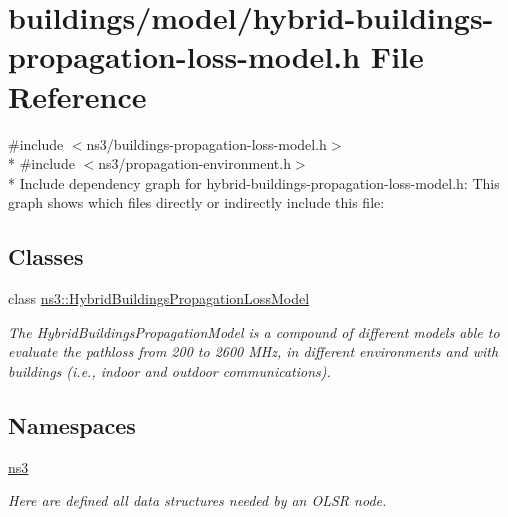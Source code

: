 \hypertarget{hybrid-buildings-propagation-loss-model_8h}{}\section{buildings/model/hybrid-\/buildings-\/propagation-\/loss-\/model.h File Reference}
\label{hybrid-buildings-propagation-loss-model_8h}
{\ttfamily \#include $<$ns3/buildings-\/propagation-\/loss-\/model.\+h$>$}\\*
{\ttfamily \#include $<$ns3/propagation-\/environment.\+h$>$}\\*
Include dependency graph for hybrid-\/buildings-\/propagation-\/loss-\/model.h\+:
This graph shows which files directly or indirectly include this file\+:
\subsection*{Classes}
\begin{DoxyCompactItemize}
\item 
class \hyperlink{classns3_1_1HybridBuildingsPropagationLossModel}{ns3\+::\+Hybrid\+Buildings\+Propagation\+Loss\+Model}
\begin{DoxyCompactList}\small\item\em The Hybrid\+Buildings\+Propagation\+Model is a compound of different models able to evaluate the pathloss from 200 to 2600 M\+Hz, in different environments and with buildings (i.\+e., indoor and outdoor communications). \end{DoxyCompactList}\end{DoxyCompactItemize}
\subsection*{Namespaces}
\begin{DoxyCompactItemize}
\item 
 \hyperlink{namespacens3}{ns3}
\begin{DoxyCompactList}\small\item\em Here are defined all data structures needed by an O\+L\+SR node. \end{DoxyCompactList}\end{DoxyCompactItemize}

